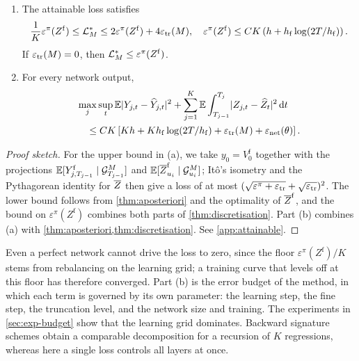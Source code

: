 \begin{theorem}\label{thm:attainable}
\leavevmode
\begin{enumerate}[label=(\alph*)]
\item The attainable loss satisfies
\[
\frac1K\varepsilon^\pi(Z^{\mathrm f})\le\mathcal{L}^{*}_{M}\le2\varepsilon^\pi(Z^{\mathrm f})+4\varepsilon_{\mathrm{tr}}(M),\quad
\varepsilon^\pi(Z^{\mathrm f})\le CK\left(h+h_{\mathrm f}\log(2T/h_{\mathrm f})\right).
\]
If $\varepsilon_{\mathrm{tr}}(M)=0$, then $\mathcal{L}^{*}_{M}\le\varepsilon^\pi(Z^{\mathrm f})$.
\item For every network output,
\[
\begin{aligned}
&\max_j\sup_t\mathbb{E}\lvert Y_{j,t}-\widehat Y_{j,t}\rvert^2+\sum_{j=1}^K\mathbb{E}\int_{T_{j-1}}^{T_j}\lvert Z_{j,t}-\widehat Z_t\rvert^2\,\mathrm{d} t\\
&\quad\le CK\left[Kh+Kh_{\mathrm f}\log(2T/h_{\mathrm f})+\varepsilon_{\mathrm{tr}}(M)+\varepsilon_{\mathrm{net}}(\theta)\right].
\end{aligned}
\]
\end{enumerate}
\end{theorem}

\begin{proof}[Proof sketch]
For the upper bound in (a), we take $y_0=V^{\mathrm f}_0$ together with the projections $\mathbb{E}[Y^{\mathrm f}_{j,T_{j-1}}\mid\mathcal{G}^M_{T_{j-1}}]$ and $\mathbb{E}[\overline Z^{\mathrm f}_{u_i}\mid\mathcal{G}^M_{u_i}]$; It\^o's isometry and the Pythagorean identity for $\overline Z$ then give a loss of at most $(\sqrt{\varepsilon^\pi+\varepsilon_{\mathrm{tr}}}+\sqrt{\varepsilon_{\mathrm{tr}}})^2$. The lower bound follows from \cref{thm:aposteriori} and the optimality of $\overline Z^{\mathrm f}$, and the bound on $\varepsilon^\pi(Z^{\mathrm f})$ combines both parts of \cref{thm:discretisation}. Part (b) combines (a) with \cref{thm:aposteriori,thm:discretisation}. See \cref{app:attainable}.
\end{proof}

\begin{remark}\label{rem:attainable}
Even a perfect network cannot drive the loss to zero, since the floor $\varepsilon^\pi(Z^{\mathrm f})/K$ stems from rebalancing on the learning grid; a training curve that levels off at this floor has therefore converged. Part (b) is the error budget of the method, in which each term is governed by its own parameter: the learning step, the fine step, the truncation level, and the network size and training. The experiments in \cref{sec:exp-budget} show that the learning grid dominates. Backward signature schemes \cite{bayraktar2024} obtain a comparable decomposition for a recursion of $K$ regressions, whereas here a single loss controls all layers at once.
\end{remark}

